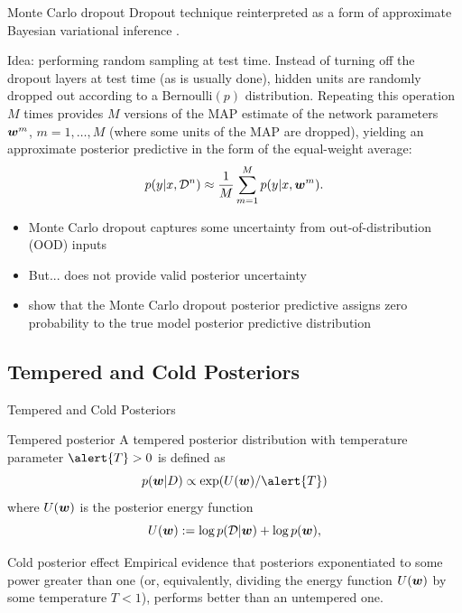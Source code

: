 \documentclass[9pt]{beamer}
\begin{document}
\begin{frame}{Monte Carlo dropout}
\alert{Dropout} technique reinterpreted as a form of approximate Bayesian variational inference \citep{kingma2015variational,gal2016dropout}.

\alert{Idea}: performing random sampling at test time. Instead of turning off the dropout layers at test time (as is usually done), \alert{hidden units} are randomly dropped out according to a \alert{Bernoulli$(p)$} distribution. Repeating this operation $M$ times provides $M$ versions of the MAP estimate of the network parameters $\boldsymbol{w}^m$, $m=1,\ldots,M$ (where some units of the MAP are dropped), yielding an approximate posterior predictive in the form of the equal-weight average:
\begin{equation*}
	p(y\vert x, \mathcal{D}^n)\approx \frac{1}{M}\sum_{m=1}^M p(y\vert x, \boldsymbol{w}^m).
\end{equation*}

\vfill 

\begin{itemize}[<+->]
	\item Monte Carlo dropout captures some uncertainty from out-of-distribution (OOD) inputs
	\item But... \alert{does not provide valid posterior uncertainty}
	\item \citet{folgoc2021mc} show that the Monte Carlo dropout posterior predictive assigns \alert{zero probability} to the true model posterior predictive distribution
\end{itemize}
\end{frame}

\subsection{Tempered and Cold Posteriors}

\begin{frame}{Tempered and Cold Posteriors}
\begin{block}{Tempered posterior}
	A \alert{tempered posterior distribution} with \alert{temperature parameter} $\alert{T}>0$ is defined as $$p(\bw|D) \propto \exp(U (\bw)/\alert{T} )$$ where $U(\boldsymbol{w})$ is the posterior energy function
\begin{equation*}
 U(\boldsymbol{w}) :=  \log p(\mathcal{D} | \boldsymbol{w}) + \log p(\boldsymbol{w}),
\end{equation*}
\end{block}

\pause

\begin{block}{Cold posterior effect}
Empirical evidence \citep{wenzel2020good} that posteriors  exponentiated to some power greater than one (or, equivalently, dividing the energy function $U(\boldsymbol{w})$ by some temperature $T<1$), \alert{performs better} than an untempered one.
\end{block}
\end{frame}
	
\end{document}
